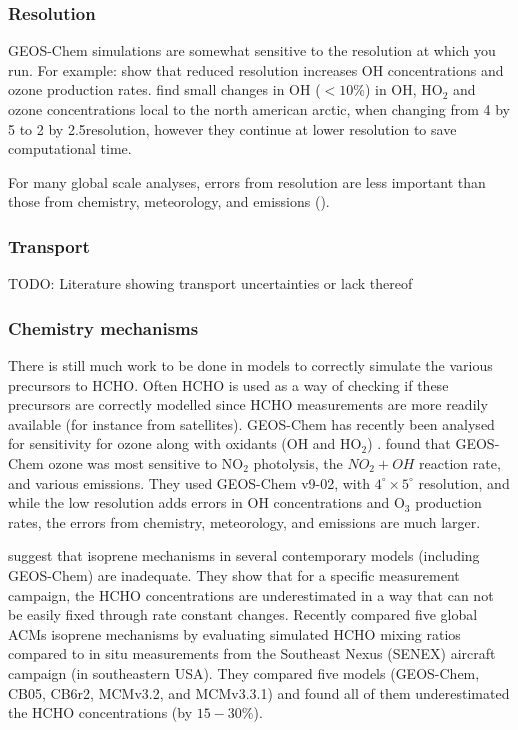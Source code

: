    \subsubsection{Resolution}
      \label{LR:Models:Unc:Resolution}
      GEOS-Chem simulations are somewhat sensitive to the resolution at which you run.
      For example: \cite{Wild2006} show that reduced resolution increases OH concentrations and ozone production rates.
      \cite{Christian2017} find small changes in OH ($<10$\%) in OH, HO$_2$ and ozone concentrations local to the north american arctic, when changing from 4 by 5 to 2 by 2.5\degr resolution, however they continue at lower resolution to save computational time.
      
      For many global scale analyses, errors from resolution are less important than those from chemistry, meteorology, and emissions (\cite{Christian2017}).
      
    
    \subsubsection{Transport}
      \label{LR:Models:Unc:Transport}
      TODO: Literature showing transport uncertainties or lack thereof     
    
    \subsubsection{Chemistry mechanisms}
      \label{LR:Models:Unc:Chemistry}
      There is still much work to be done in models to correctly simulate the various precursors to HCHO.
      Often HCHO is used as a way of checking if these precursors are correctly modelled since HCHO measurements are more readily available (for instance from satellites).
      GEOS-Chem has recently been analysed for sensitivity for ozone along with oxidants (OH and HO$_2$) \citep{Christian2017}.
      \cite{Christian2017} found that GEOS-Chem ozone was most sensitive to NO$_2$ photolysis, the $NO_2 + OH$ reaction rate, and various emissions.
      They used GEOS-Chem v9-02, with $4^{\circ} \times 5^{\circ}$ resolution, and while the low resolution adds errors in OH concentrations and O$_3$ production rates, the errors from chemistry, meteorology, and emissions are much larger.

      \cite{Marvin2017} suggest that isoprene mechanisms in several contemporary models (including GEOS-Chem) are inadequate. 
      They show that for a specific measurement campaign, the HCHO concentrations are underestimated in a way that can not be easily fixed through rate constant changes.
      Recently \cite{Marvin2017} compared five global ACMs isoprene mechanisms by evaluating simulated HCHO mixing ratios compared to in situ measurements from the Southeast Nexus (SENEX) aircraft campaign (in southeastern USA).
      They compared five models (GEOS-Chem, CB05, CB6r2, MCMv3.2, and MCMv3.3.1) and found all of them underestimated the HCHO concentrations (by $15 - 30\%$).
    
